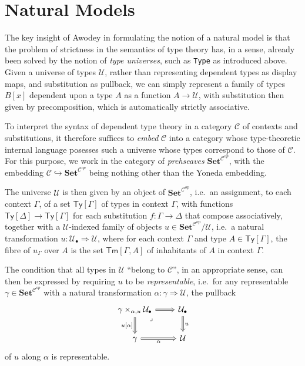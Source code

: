 \documentclass[
  11pt,
  oneside,
  article]{memoir}
\theoremstyle{definition}
\theoremstyle{plain}
\newcommand{\0}{\textsf{0}}
\newcommand{\1}{\tn{\textsf{1}}}
\begin{document}
\section{Natural Models}\label{natural-models}

The key insight of Awodey in formulating the notion of a natural model
is that the problem of strictness in the semantics of type theory has,
in a sense, already been solved by the notion of \emph{type universes},
such as \texttt{Type} as introduced above. Given a universe of types
\(\mathcal{U}\), rather than representing dependent types as display
maps, and substitution as pullback, we can simply represent a family of
types \(B[x]\) dependent upon a type \(A\) as a function
\(A \to \mathcal{U}\), with substitution then given by precomposition,
which is automatically strictly associative.

To interpret the syntax of dependent type theory in a category
\(\mathcal{C}\) of contexts and substitutions, it therefore suffices to
\emph{embed} \(\mathcal{C}\) into a category whose type-theoretic
internal language posesses such a universe whose types correspond to
those of \(\mathcal{C}\). For this purpose, we work in the category of
\emph{prehseaves} \(\mathbf{Set}^{\mathcal{C}^{op}}\), with the
embedding
\(\mathcal{C} \hookrightarrow \mathbf{Set}^{\mathcal{C}^{op}}\) being
nothing other than the Yoneda embedding.

The universe \(\mathcal{U}\) is then given by an object of
\(\mathbf{Set}^{\mathcal{C}^{op}}\), i.e.~an assignment, to each context
\(\Gamma\), of a set \(\mathsf{Ty}[\Gamma]\) of types in context
\(\Gamma\), with functions
\(\mathsf{Ty}[\Delta] \to \mathsf{Ty}[\Gamma]\) for each substitution
\(f : \Gamma \to \Delta\) that compose associatively, together with a
\(\mathcal{U}\)-indexed family of objects
\(u \in \mathbf{Set}^{\mathcal{C}^{op}}/\mathcal{U}\), i.e.~a natural
transformation \(u : \mathcal{U}_\bullet \Rightarrow \mathcal{U}\),
where for each context \(\Gamma\) and type
\(A \in \mathsf{Ty}[\Gamma]\), the fibre of \(u_\Gamma\) over \(A\) is
the set \(\mathsf{Tm}[\Gamma,A]\) of inhabitants of \(A\) in context
\(\Gamma\).

The condition that all types in \(\mathcal{U}\) ``belong to
\(\mathcal{C}\)'', in an appropriate sense, can then be expressed by
requiring \(u\) to be \emph{representable}, i.e.~for any representable
\(\gamma \in \mathbf{Set}^{\mathcal{C}^{op}}\) with a natural
transformation \(\alpha : \gamma \Rightarrow \mathcal{U}\), the pullback
\[
\begin{tikzcd}
    {\mathcal{\gamma} \times_{\alpha, u} \mathcal{U}_\bullet} & {\mathcal{U}_\bullet} \\
    \gamma & {\mathcal{U}}
    \arrow[Rightarrow, from=1-1, to=1-2]
    \arrow["{u[\alpha]}"', Rightarrow, from=1-1, to=2-1]
    \arrow["\lrcorner"{anchor=center, pos=0.125}, draw=none, from=1-1, to=2-2]
    \arrow["u", Rightarrow, from=1-2, to=2-2]
    \arrow["\alpha"', Rightarrow, from=2-1, to=2-2]
\end{tikzcd}
\] of \(u\) along \(\alpha\) is representable.
\end{document}
